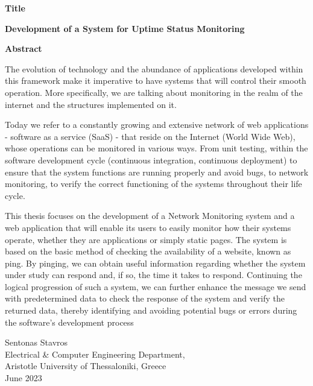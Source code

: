 {\selectfont

{}


\begin{center}
  \centering
  \textbf{\Large{Title}}
  \vspace{0.5cm}

  \textbf{\large{Development of a System for Uptime Status Monitoring}}
  \vspace{1cm}

  \centering
  \textbf{Abstract}
\end{center}

The evolution of technology and the abundance of applications developed within this framework make it imperative to have systems that will control their smooth operation. More specifically, we are talking about monitoring in the realm of the internet and the structures implemented on it.

Today we refer to a constantly growing and extensive network of web applications - software as a service (SaaS) - that reside on the Internet (World Wide Web), whose operations can be monitored in various ways. From unit testing, within the software development cycle (continuous integration, continuous deployment) to ensure that the system functions are running properly and avoid bugs, to network monitoring, to verify the correct functioning of the systems throughout their life cycle.

This thesis focuses on the development of a Network Monitoring system and a web application that will enable its users to easily monitor how their systems operate, whether they are applications or simply static pages. The system is based on the basic method of checking the availability of a website, known as ping. By pinging, we can obtain useful information regarding whether the system under study can respond and, if so, the time it takes to respond. Continuing the logical progression of such a system, we can further enhance the message we send with predetermined data to check the response of the system and verify the returned data, thereby identifying and avoiding potential bugs or errors during the software's development process

\begin{flushright}
  \vspace{2cm}
  Sentonas Stavros
  \\
  Electrical \& Computer Engineering Department,
  \\
  Aristotle University of Thessaloniki, Greece
  \\
  June 2023
\end{flushright}

}

